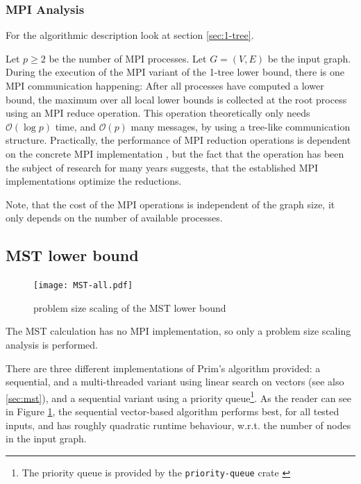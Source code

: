 \subsubsection{MPI Analysis}

For the algorithmic description look at section \ref{sec:1-tree}.

Let $p \geq 2$ be the number of \ac{MPI} processes.
Let $G = (V,E)$ be the input graph.
During the execution of the \ac{MPI} variant of the 1-tree lower bound,
there is one \ac{MPI} communication happening:
After all processes have computed a lower bound, the maximum over all
local lower bounds is collected at the root process using an \ac{MPI} reduce operation.
This operation theoretically only needs $\mathcal{O}(\log p)$ time, and $\mathcal{O}(p)$ many
messages, by using a tree-like communication structure.
Practically, the performance of \ac{MPI} reduction operations is dependent on the concrete \ac{MPI} implementation
\cite[section 5.9]{message_passing_interface_forum_mpi_2015},
but the fact that the operation has been the subject of research for many years 
\cite{malyshkin_hierarchical_2015} suggests, that the established
\ac{MPI} implementations optimize the reductions.

Note, that the cost of the \ac{MPI} operations is independent of the graph size,
it only depends on the number of available processes.

\subsection{MST lower bound}
\label{sec:mst_bench}

\begin{figure}[H]
\texttt{[image: MST-all.pdf]}
\caption{problem size scaling of the MST lower bound}
\label{fig:weak_scaling_mst}
\end{figure}

The \ac{MST} calculation has no \ac{MPI} implementation,
so only a problem size scaling analysis is performed.


There are three different implementations of Prim's algorithm provided:
a sequential, and a multi-threaded variant using linear search on vectors (see also \ref{sec:mst}),
and a sequential variant using a
priority queue\footnote{The priority queue is provided by the \texttt{priority-queue} crate \cite{garro95_priorityqueue_2023}}.
As the reader can see in Figure \ref{fig:weak_scaling_mst},
the sequential vector-based algorithm performs best,
for all tested inputs, and has roughly quadratic runtime behaviour,
w.r.t. the number of nodes in the input graph.

